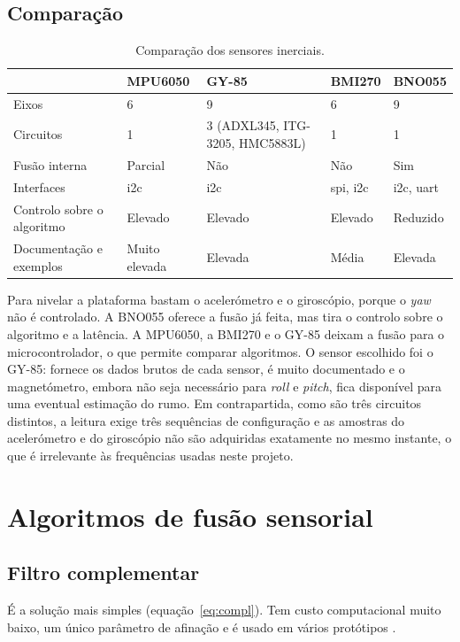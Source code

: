 \subsection{Comparação}
\begin{table}[H]
\centering\small
\caption{Comparação dos sensores inerciais.}
\begin{tabularx}{\textwidth}{>{\raggedright\arraybackslash}p{2.6cm}YYYY}
\toprule
 & MPU6050 & GY-85 & BMI270 & BNO055\\\midrule
Eixos & 6 & 9 & 6 & 9\\
Circuitos & 1 & 3 (ADXL345, ITG-3205, HMC5883L) & 1 & 1\\
Fusão interna & Parcial & Não & Não & Sim\\
Interfaces & \acrshort{i2c} & \acrshort{i2c} & \acrshort{spi}, \acrshort{i2c} & \acrshort{i2c}, \acrshort{uart}\\
Controlo sobre o algoritmo & Elevado & Elevado & Elevado & Reduzido\\
Documentação e exemplos & Muito elevada & Elevada & Média & Elevada\\
\bottomrule
\end{tabularx}
\label{tab:imu}
\end{table}

Para nivelar a plataforma bastam o acelerómetro e o giroscópio, porque o \textit{yaw} não é controlado. A BNO055 oferece a fusão já feita, mas tira o controlo sobre o algoritmo e a latência. A MPU6050, a BMI270 e o GY-85 deixam a fusão para o microcontrolador, o que permite comparar algoritmos. O sensor escolhido foi o GY-85: fornece os dados brutos de cada sensor, é muito documentado e o magnetómetro, embora não seja necessário para \textit{roll} e \textit{pitch}, fica disponível para uma eventual estimação do rumo. Em contrapartida, como são três circuitos distintos, a leitura exige três sequências de configuração e as amostras do acelerómetro e do giroscópio não são adquiridas exatamente no mesmo instante, o que é irrelevante às frequências usadas neste projeto.

\section{Algoritmos de fusão sensorial}

\subsection{Filtro complementar}
É a solução mais simples (equação~\eqref{eq:compl}). Tem custo computacional muito baixo, um único parâmetro de afinação e é usado em vários protótipos \cite{tawfeeq2022}.

